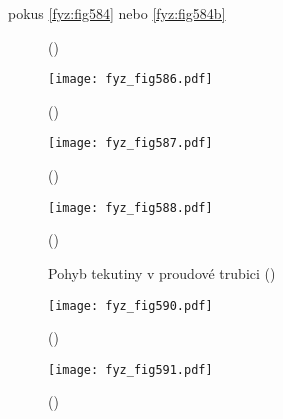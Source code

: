     pokus \ref{fyz:fig584} nebo \ref{fyz:fig584b}
    
    \begin{figure}[ht!]
      \centering
      \label{fyz:fig585}
      \caption{
               (\cite[s.~748]{Feynman02})}
    \end{figure}

    \begin{figure}[ht!] %
      \centering
      \texttt{[image: fyz\_fig586.pdf]}
      \caption{
               (\cite[s.~707]{Feynman02})}
      \label{fyz:fig586}
    \end{figure}
    
    \begin{figure}[ht!] %
      \centering
      \texttt{[image: fyz\_fig587.pdf]}
      \caption{
               (\cite[s.~707]{Feynman02})}
      \label{fyz:fig587}
    \end{figure}

    \begin{figure}[ht!] %
      \centering
      \texttt{[image: fyz\_fig588.pdf]}
      \caption{
               (\cite[s.~707]{Feynman02})}
      \label{fyz:fig588}
    \end{figure}

    \begin{figure}[ht!]
      \centering
                     \newline
      \caption{Pohyb tekutiny v proudové trubici
               (\cite[s.~748]{Feynman02})}
    \end{figure}

    \begin{figure}[ht!] %
      \centering
      \texttt{[image: fyz\_fig590.pdf]}
      \caption{
               (\cite[s.~707]{Feynman02})}
      \label{fyz:fig590}
    \end{figure}
    
    \begin{figure}[ht!] %
      \centering
      \texttt{[image: fyz\_fig591.pdf]}
      \caption{
               (\cite[s.~707]{Feynman02})}
      \label{fyz:fig591}
    \end{figure}

